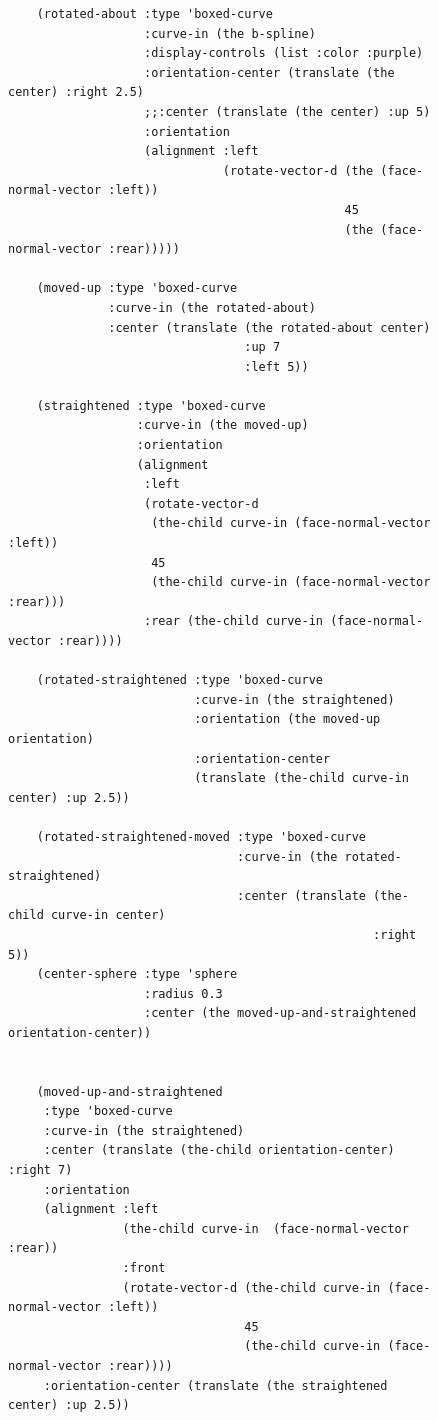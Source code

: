 \documentclass [11pt]{book}
\begin{document}
\begin{itemize}
\begin{figure}
\begin{lrbox}{\boxedverb}
\begin{minipage}{\linewidth}
{\begin{verbatim}
    (rotated-about :type 'boxed-curve
                   :curve-in (the b-spline)
                   :display-controls (list :color :purple)
                   :orientation-center (translate (the center) :right 2.5)
                   ;;:center (translate (the center) :up 5)
                   :orientation 
                   (alignment :left 
                              (rotate-vector-d (the (face-normal-vector :left))
                                               45
                                               (the (face-normal-vector :rear)))))
  
    (moved-up :type 'boxed-curve
              :curve-in (the rotated-about)
              :center (translate (the rotated-about center) 
                                 :up 7
                                 :left 5))

    (straightened :type 'boxed-curve
                  :curve-in (the moved-up)
                  :orientation 
                  (alignment 
                   :left 
                   (rotate-vector-d 
                    (the-child curve-in (face-normal-vector :left))
                    45
                    (the-child curve-in (face-normal-vector :rear)))
                   :rear (the-child curve-in (face-normal-vector :rear))))

    (rotated-straightened :type 'boxed-curve
                          :curve-in (the straightened)
                          :orientation (the moved-up orientation)
                          :orientation-center 
                          (translate (the-child curve-in center) :up 2.5))
 
    (rotated-straightened-moved :type 'boxed-curve
                                :curve-in (the rotated-straightened)
                                :center (translate (the-child curve-in center) 
                                                   :right 5))
    (center-sphere :type 'sphere 
                   :radius 0.3 
                   :center (the moved-up-and-straightened orientation-center))
   
   
    (moved-up-and-straightened 
     :type 'boxed-curve
     :curve-in (the straightened)
     :center (translate (the-child orientation-center) :right 7)
     :orientation 
     (alignment :left 
                (the-child curve-in  (face-normal-vector :rear)) 
                :front
                (rotate-vector-d (the-child curve-in (face-normal-vector :left))
                                 45
                                 (the-child curve-in (face-normal-vector :rear))))
     :orientation-center (translate (the straightened center) :up 2.5))
    

\end{verbatim}}
\end{minipage}
\end{lrbox}
\end{figure}
\end{itemize}
\end{document}
